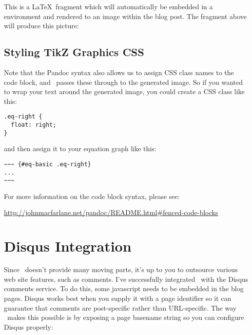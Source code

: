 \documentclass[11pt, letterpaper, oneside, titlepage]{book}
\begin{document}
This is a \LaTeX\ fragment which will automatically be embedded in a
 environment and rendered to an image within the blog
post.  The fragment above will produce this picture:


\subsection{Styling TikZ Graphics CSS}

Note that the Pandoc syntax also allows us to assign CSS class names
to the code block, and \mathblog\ passes these through to the generated
image.  So if you wanted to wrap your text around the generated image,
you could create a CSS class like this:

\begin{verbatim}
.eq-right {
  float: right;
}
\end{verbatim}

and then assign it to your equation graph like this:

\begin{verbatim}
~~~ {#eq-basic .eq-right}
...
~~~
\end{verbatim}

For more information on the code block syntax, please see:

\href{http://johnmacfarlane.net/pandoc/README.html\#fenced-code-blocks}{http://johnmacfarlane.net/pandoc/README.html\#fenced-code-blocks
}

\section{Disqus Integration}
\label{sec:disqus}

Since \mathblog\ doesn't provide many moving parts, it's up to you to
outsource various web site features, such as comments.  I've
successfully integrated \mathblog\ with the Disqus comments service.  To
do this, some javascript needs to be embedded in the blog pages.
Disqus works best when you supply it with a page identifier so it can
guarantee that comments are post-specific rather than URL-specific.
The way \mathblog\ makes this possible is by exposing a page basename
string so you can configure Disqus properly:
\end{document}
